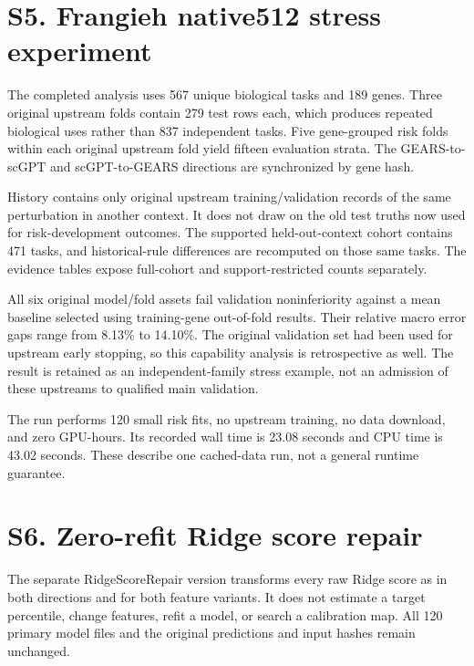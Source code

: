 \documentclass[journal,onecolumn]{IEEEtran}
\begin{document}
\section{S5. Frangieh native512 stress experiment}

The completed analysis uses 567 unique biological tasks and 189 genes. Three original upstream folds contain 279 test rows each, which produces repeated biological uses rather than 837 independent tasks. Five gene-grouped risk folds within each original upstream fold yield fifteen evaluation strata. The GEARS-to-scGPT and scGPT-to-GEARS directions are synchronized by gene hash.


History contains only original upstream training/validation records of the same perturbation in another context. It does not draw on the old test truths now used for risk-development outcomes. The supported held-out-context cohort contains 471 tasks, and historical-rule differences are recomputed on those same tasks. The evidence tables expose full-cohort and support-restricted counts separately.


All six original model/fold assets fail validation noninferiority against a mean baseline selected using training-gene out-of-fold results. Their relative macro error gaps range from 8.13\% to 14.10\%. The original validation set had been used for upstream early stopping, so this capability analysis is retrospective as well. The result is retained as an independent-family stress example, not an admission of these upstreams to qualified main validation.


The run performs 120 small risk fits, no upstream training, no data download, and zero GPU-hours. Its recorded wall time is 23.08 seconds and CPU time is 43.02 seconds. These describe one cached-data run, not a general runtime guarantee.


\section{S6. Zero-refit Ridge score repair}

The separate RidgeScoreRepair version transforms every raw Ridge score as \texttt{} in both directions and for both feature variants. It does not estimate a target percentile, change features, refit a model, or search a calibration map. All 120 primary model files and the original predictions and input hashes remain unchanged.
\end{document}
